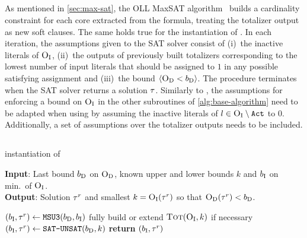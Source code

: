\subsection{\oll{}\label{sec:oll}}

As mentioned in \cref{sec:max-sat}, the OLL MaxSAT algorithm~\autocite{DBLP:conf/cp/MorgadoDM14,DBLP:journals/jsat/IgnatievMM19} builds a cardinality constraint for each core extracted from the formula, treating the totalizer output as new soft clauses.
The same holds true for the \oll{} instantiation of \Min{}.
In each iteration, the assumptions given to the SAT solver consist of (i)~the inactive literals of $\textsc{O}_{\text{I}}$, (ii)~the outputs of previously built totalizers corresponding to the lowest number of input literals that should be assigned to $1$ in any possible satisfying assignment and (iii)~the bound $\langle \textsc{O}_{\text{D}} < b_{\text{D}} \rangle$.
The procedure terminates when the SAT solver returns a solution $\tau$.
Similarly to \msu{}, the assumptions for enforcing a bound on $\textsc{O}_{\text{I}}$ in the other subroutines of \cref{alg:base-algorithm} need to be adapted when using \oll{} by assuming the inactive literals of $l \in \textsc{O}_{\text{I}} \setminus \texttt{Act}$ to $0$.
Additionally, a set of assumptions over the totalizer outputs needs to be included.


\subsection{\msh{}\label{sec:hybrid}}

\begin{algorithm}[t]
  \caption{\msh{} instantiation of \Min{}}\label{alg:msh}
  \textbf{Input}: Last bound $b_{\text{D}}$ on $\textsc{O}_{\text{D}}$, known upper and lower bounds $k$ and $b_{\text{I}}$ on min.\ of $\textsc{O}_{\text{I}}$. \\
  \textbf{Output}: Solution $\tau^r$ and smallest $k=\textsc{O}_{\text{I}}(\tau^r)$ so that $\textsc{O}_{\text{D}}(\tau^r)<b_{\text{D}}$.

  \begin{algorithmic}[1]
    \IF{$|\Act| < \thr \cdot |\Obj_\inc|$}
      \STATE $(b_{\text{I}},\tau^r) \gets \texttt{MSU3}{}(b_{\text{D}}, b_{\text{I}})$  \label{ln:msh-msu}
    \ENDIF
    \IF{$|\Act| \ge \thr \cdot |\Obj_\inc|$}
      \STATE fully build or extend $\textsc{Tot}(\textsc{O}_{\text{I}}, k)$ if necessary \label{ln:msh-tot}
      \STATE $(b_{\text{I}},\tau^r) \gets \texttt{SAT-\allowbreak{}UNSAT}{}(b_{\text{D}}, k)$ \label{ln:msh-su}
    \ENDIF
    \STATE \textbf{return} $(b_{\text{I}},\tau^r)$ \label{ln:msh-ret}
  \end{algorithmic}
\end{algorithm}

